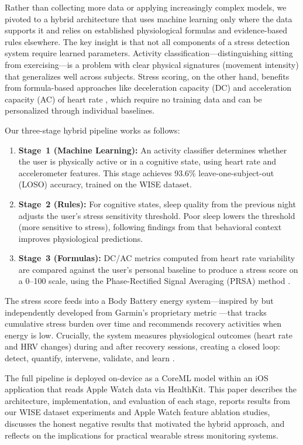 \documentclass[12pt,letterpaper]{article}
\begin{document}
Rather than collecting more data or applying increasingly complex models, we pivoted to a hybrid architecture that uses machine learning only where the data supports it and relies on established physiological formulas and evidence-based rules elsewhere. The key insight is that not all components of a stress detection system require learned parameters. Activity classification---distinguishing sitting from exercising---is a problem with clear physical signatures (movement intensity) that generalizes well across subjects. Stress scoring, on the other hand, benefits from formula-based approaches like deceleration capacity (DC) and acceleration capacity (AC) of heart rate \citep{bauer2006prsa}, which require no training data and can be personalized through individual baselines.

Our three-stage hybrid pipeline works as follows:
\begin{enumerate}
    \item \textbf{Stage~1 (Machine Learning):} An activity classifier determines whether the user is physically active or in a cognitive state, using heart rate and accelerometer features. This stage achieves 93.6\% leave-one-subject-out (LOSO) accuracy, trained on the WISE dataset.
    \item \textbf{Stage~2 (Rules):} For cognitive states, sleep quality from the previous night adjusts the user's stress sensitivity threshold. Poor sleep lowers the threshold (more sensitive to stress), following findings from \cite{apple2024behavioral} that behavioral context improves physiological predictions.
    \item \textbf{Stage~3 (Formulas):} DC/AC metrics computed from heart rate variability are compared against the user's personal baseline to produce a stress score on a 0--100 scale, using the Phase-Rectified Signal Averaging (PRSA) method \citep{bauer2006prsa}.
\end{enumerate}

The stress score feeds into a Body Battery energy system---inspired by but independently developed from Garmin's proprietary metric \citep{garmin2024bodybattery}---that tracks cumulative stress burden over time and recommends recovery activities when energy is low. Crucially, the system measures physiological outcomes (heart rate and HRV changes) during and after recovery sessions, creating a closed loop: detect, quantify, intervene, validate, and learn \citep{barricelli2019digital}.

The full pipeline is deployed on-device as a CoreML model \citep{apple2023coreml} within an iOS application that reads Apple Watch data via HealthKit. This paper describes the architecture, implementation, and evaluation of each stage, reports results from our WISE dataset experiments and Apple Watch feature ablation studies, discusses the honest negative results that motivated the hybrid approach, and reflects on the implications for practical wearable stress monitoring systems.
\end{document}
